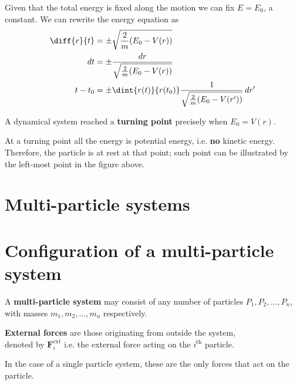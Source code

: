 \documentclass[12pt, a4paper]{article}
\begin{document}
\noindent Given that the total energy is fixed along the motion we can fix \(E=E_0\), a constant. We can rewrite the energy equation as
\[\begin{aligned}
    \diff{r}{t} &= \pm \sqrt{\frac{2}{m}(E_0-V(r))} \\
    dt &= \pm \frac{dr}{\sqrt{\frac{2}{m}(E_0-V(r))}}\\
    t-t_0 &= \pm \dint{r(t)}{r(t_0)} \frac{1}{\sqrt{\frac{2}{m}(E_0-V(r'))}} \, dr'
\end{aligned}\]

\begin{definition}
    A dynamical system reached a \textbf{turning point} precisely when \(E_0= V(r)\).
\end{definition}

\noindent At a turning point all the energy is potential energy, i.e. \textbf{no} kinetic energy. Therefore, the particle is at rest at that point; such point can be illustrated by the left-most point in the figure above.

\pagebreak

\section*{Multi-particle systems}

\section{Configuration of a multi-particle system}

\begin{definition}
    A \textbf{multi-particle system} may consist of any number of particles \(P_1,P_2,\ldots, P_n\), with masses \(m_1,m_2,\ldots, m_n\) respectively.
\end{definition}

\begin{definition}
    \textbf{External forces} are those originating from outside the system, \\ denoted by \(\bm{F}_i^{\text{ext}}\) i.e. the external force acting on the \(i^{\text{th}}\) particle.
\end{definition}

\begin{mdremark}
    In the case of a single particle system, these are the only forces that act on the particle.
\end{mdremark}
\end{document}
